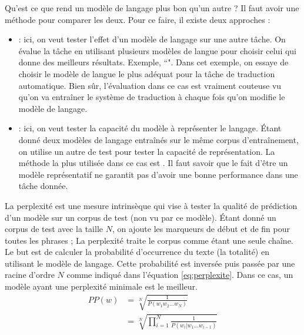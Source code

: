 \documentclass{KodeBook}
\begin{document}
Qu'est ce que rend un modèle de langage plus bon qu'un autre ? 
Il faut avoir une méthode pour comparer les deux. 
Pour ce faire, il existe deux approches : 
	\begin{itemize}
		\item {} : ici, on veut tester l'effet d'un modèle de langage sur une autre tâche. 
		On évalue la tâche en utilisant plusieurs modèles de langue pour choisir celui qui donne des meilleurs résultats.
		Exemple, ``". 
		Dans cet exemple, on essaye de choisir le modèle de langue le plus adéquat pour la tâche de traduction automatique.
		Bien sûr, l'évaluation dans ce cas est vraiment couteuse vu qu'on va entraîner le système de traduction à chaque fois qu'on modifie le modèle de langage.
		
		\item {} : ici, on veut tester la capacité du modèle à représenter le langage. 
		Étant donné deux modèles de langage entraînés sur le même corpus d'entraînement, on utilise un autre de test pour tester la capacité de représentation.
		La méthode la plus utilisée dans ce cas est .
		Il faut savoir que le fait d'être un modèle représentatif ne garantit pas d'avoir une bonne performance dans une tâche donnée.
	\end{itemize}


La perplexité est une mesure intrinsèque qui vise à tester la qualité de prédiction d'un modèle sur un corpus de test (non vu par ce modèle). 
Étant donné un corpus de test avec la taille $N$, on ajoute les marqueurs de début et de fin pour toutes les phrases ; La perplexité traite le corpus comme étant une seule chaîne. 
Le but est de calculer la probabilité d'occurrence du texte (la totalité) en utilisant le modèle de langage. 
Cette probabilité est inversée puis passée par une racine d'ordre $N$ comme indiqué dans l'équation \ref{eq:perplexite}.
Dans ce cas, un modèle ayant une perplexité minimale est le meilleur.
%
\begin{align}
	PP(w) & = \sqrt[N]{\frac{1}{P(w_1 w_2 \ldots w_N)}} \nonumber\\
	 & = \sqrt[N]{\prod\limits_{i=1}^{N}\frac{1}{P(w_i | w_1 \ldots w_{i-1})}} \label{eq:perplexite}
\end{align}
\end{document}
